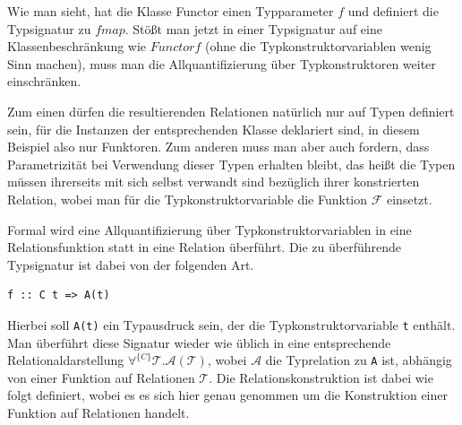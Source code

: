 Wie man sieht, hat die Klasse Functor einen Typparameter $f$ und definiert die Typsignatur zu $fmap$. Stößt man jetzt in
einer Typsignatur auf eine Klassenbeschränkung wie $Functor f$ (ohne die Typkonstruktorvariablen wenig Sinn machen),
muss man die Allquantifizierung über Typkonstruktoren weiter einschränken.

Zum einen dürfen die resultierenden Relationen natürlich nur auf Typen definiert sein, für die Instanzen der entsprechenden
Klasse deklariert sind, in diesem Beispiel also nur Funktoren.
Zum anderen muss man aber auch fordern, dass Parametrizität bei Verwendung dieser Typen erhalten bleibt,
das heißt die Typen müssen ihrerseits mit sich selbst verwandt sind bezüglich ihrer konstrierten Relation, wobei man für
die Typkonstruktorvariable die Funktion $\mathcal{F}$ einsetzt. 


Formal wird eine Allquantifizierung über Typkonstruktorvariablen in eine Relationsfunktion statt in eine Relation überführt. Die
zu überführende Typsignatur ist dabei von der folgenden Art.

\begin{verbatim}
f :: C t => A(t)
\end{verbatim}

Hierbei soll \texttt{A(t)} ein Typausdruck sein, der die Typkonstruktorvariable \texttt{t} enthält. Man überführt diese Signatur wieder
wie üblich in eine entsprechende Relationaldarstellung $\forall^{\{C\}} \mathcal{T} . \mathcal{A}(\mathcal{T})$, wobei $\mathcal{A}$
die Typrelation zu \texttt{A} ist, abhängig von einer Funktion auf Relationen $\mathcal{T}$. Die Relationskonstruktion ist
dabei wie folgt definiert, wobei es es sich hier genau genommen um die Konstruktion einer Funktion auf Relationen handelt.


